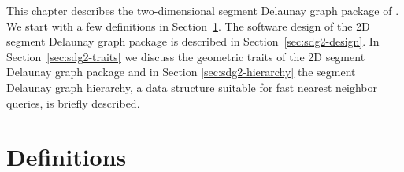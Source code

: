
This chapter describes the two-dimensional segment Delaunay graph
package of \cgal. We start with a few definitions in 
Section~\ref{sec:sdg2-definitions}.
The software design of the 2D segment Delaunay graph package is
described in Section~\ref{sec:sdg2-design}.
In Section~\ref{sec:sdg2-traits} we discuss the geometric
traits of the 2D segment Delaunay graph package and in Section
\ref{sec:sdg2-hierarchy} the segment Delaunay graph hierarchy, a
data structure suitable for fast nearest neighbor queries, is briefly
described.


\section{Definitions}
\label{sec:sdg2-definitions}

